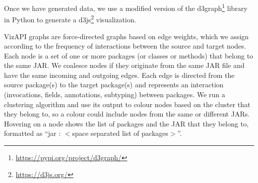 \label{sec:vis-system}

Once we have generated data, we use a modified version
of the d3graph\footnote{\url{https://pypi.org/project/d3graph/}} library in Python to generate a d3js\footnote{\url{https://d3js.org/}}
visualization. 

VizAPI graphs are force-directed graphs based on edge weights, which we assign
according to the
frequency of interactions between the source and target nodes.
Each node is a set of one or more packages (or classes or methods) 
that belong to the same JAR. We coalesce nodes if they originate from the same 
JAR file and have the same incoming and outgoing edges. Each edge is directed 
from the source package(s) to the target package(s) and represents an interaction 
(invocations, fields, annotations, subtyping) between packages. We run a 
clustering algorithm and use its output to colour nodes based on the cluster 
that they belong to, so a colour could include nodes from the same or different JARs.
Hovering on a node shows the list of packages and 
the JAR that they belong to, 
formatted as “jar : $<$space separated list of packages$>$”.
